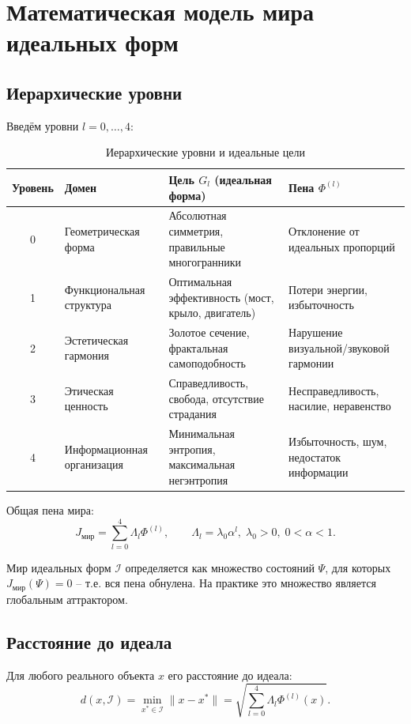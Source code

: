 \documentclass[12pt,a4paper]{article}
\begin{document}
\section{Математическая модель мира идеальных форм}

\subsection{Иерархические уровни}

Введём уровни \(l = 0,\dots,4\):

\begin{table}[h]
\centering
\caption{Иерархические уровни и идеальные цели}
\label{tab:levels}
\begin{tabular}{|c|l|l|p{6cm}|}
\hline
Уровень & Домен & Цель \(G_l\) (идеальная форма) & Пена \(\Phi^{(l)}\) \\
\hline
0 & Геометрическая форма & Абсолютная симметрия, правильные многогранники & Отклонение от идеальных пропорций \\
1 & Функциональная структура & Оптимальная эффективность (мост, крыло, двигатель) & Потери энергии, избыточность \\
2 & Эстетическая гармония & Золотое сечение, фрактальная самоподобность & Нарушение визуальной/звуковой гармонии \\
3 & Этическая ценность & Справедливость, свобода, отсутствие страдания & Несправедливость, насилие, неравенство \\
4 & Информационная организация & Минимальная энтропия, максимальная негэнтропия & Избыточность, шум, недостаток информации \\
\hline
\end{tabular}
\end{table}

Общая пена мира:
\[
J_{\text{мир}} = \sum_{l=0}^{4} \Lambda_l \Phi^{(l)}, \qquad \Lambda_l = \lambda_0 \alpha^l,\; \lambda_0>0,\;0<\alpha<1.
\]

Мир идеальных форм \(\mathcal{I}\) определяется как множество состояний \(\Psi\), для которых \(J_{\text{мир}}(\Psi) = 0\) – т.е. вся пена обнулена. На практике это множество является глобальным аттрактором.

\subsection{Расстояние до идеала}

Для любого реального объекта \(x\) его расстояние до идеала:
\[
d(x, \mathcal{I}) = \min_{x^* \in \mathcal{I}} \|x - x^*\| = \sqrt{ \sum_{l=0}^{4} \Lambda_l \Phi^{(l)}(x) }.
\]
\end{document}
